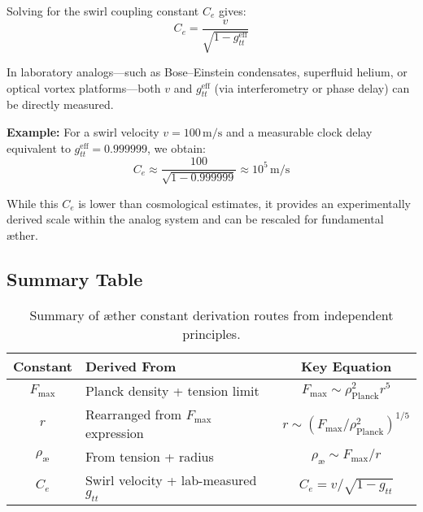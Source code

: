         Solving for the swirl coupling constant $C_e$ gives:
        \begin{equation}
            C_e = \frac{v}{\sqrt{1 - g_{tt}^{\text{eff}}}}
        \end{equation}

        In laboratory analogs—such as Bose–Einstein condensates, superfluid helium, or optical vortex platforms—both $v$ and $g_{tt}^{\text{eff}}$ (via interferometry or phase delay) can be directly measured.

        \textbf{Example:} For a swirl velocity $v = 100 \, \text{m/s}$ and a measurable clock delay equivalent to $g_{tt}^{\text{eff}} = 0.999999$, we obtain:
        \begin{equation}
            C_e \approx \frac{100}{\sqrt{1 - 0.999999}} \approx 10^5 \, \text{m/s}
        \end{equation}

        While this $C_e$ is lower than cosmological estimates, it provides an experimentally derived scale within the analog system and can be rescaled for fundamental æther.

        \subsection{ Summary Table}

        \begin{table}[H]
        \centering
        \renewcommand{\arraystretch}{1.2}
        \begin{tabular}{|c|l|c|}
        \hline
        \textbf{Constant} & \textbf{Derived From} & \textbf{Key Equation} \\
        \hline
        $F_{\max}$ & Planck density + tension limit & $F_{\max} \sim \rho_{\text{Planck}}^2 r^5$ \\
        $r$ & Rearranged from $F_{\max}$ expression & $r \sim \left(F_{\max} / \rho_{\text{Planck}}^2\right)^{1/5}$ \\
        $\rho_{\text{æ}}$ & From tension + radius & $\rho_{\text{æ}} \sim F_{\max} / r$ \\
        $C_e$ & Swirl velocity + lab-measured $g_{tt}$ & $C_e = v / \sqrt{1 - g_{tt}}$ \\
        \hline
        \end{tabular}
        \caption{Summary of æther constant derivation routes from independent principles.}
        \end{table}

        \vspace{1em}

